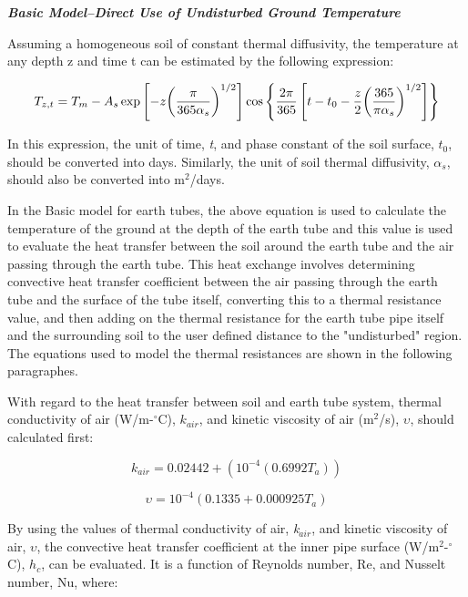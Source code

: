 \emph{\textbf{Basic Model--Direct Use of Undisturbed Ground Temperature}}

Assuming a homogeneous soil of constant thermal diffusivity, the temperature at any depth z and time t can be estimated by the following expression:

\begin{equation}
{T_{z,t}} = {T_m} - {A_s}\exp \left[ { - z{{\left( {\frac{\pi }{{{\rm{365}}{\alpha_s}}}} \right)}^{1/2}}} \right]\cos \left\{ {\frac{{2\pi }}{{{\rm{365}}}}\left[ {t - {t_0} - \frac{z}{2}{{\left( {\frac{{{\rm{365}}}}{{\pi {\alpha_s}}}} \right)}^{1/2}}} \right]} \right\}
\end{equation}

In this expression, the unit of time, \emph{t}, and phase constant of the soil surface, \(t_{0}\), should be converted into days. Similarly, the unit of soil thermal diffusivity, \({\alpha_{s}}\), should also be converted into m\(^{2}\)/days.

In the Basic model for earth tubes, the above equation is used to calculate the temperature of the ground at the depth of the earth tube and this value is used to evaluate the heat transfer between the soil around the earth tube and the air passing through the earth tube.  This heat exchange involves determining convective heat transfer coefficient between the air passing through the earth tube and the surface of the tube itself, converting this to a thermal resistance value, and then adding on the thermal resistance for the earth tube pipe itself and the surrounding soil to the user defined distance to the "undisturbed" region.  The equations used to model the thermal resistances are shown in the following paragraphes.

With regard to the heat transfer between soil and earth tube system, thermal conductivity of air (W/m-\(^{\circ}\)C), \(k_{air}\), and kinetic viscosity of air (m\(^{2}\)/s), \({\upsilon}\), should calculated first:

\begin{equation}
{k_{air}} = 0.02442 + ({10^{ - 4}}(0.6992{T_a}))
\end{equation}

\begin{equation}
\upsilon  = {10^{ - 4}}(0.1335 + 0.000925{T_a})
\end{equation}

By using the values of thermal conductivity of air, \emph{k\(_{air}\)}, and kinetic viscosity of air, \({\upsilon}\), the convective heat transfer coefficient at the inner pipe surface (W/m\(^{2}\)-\(^{\circ}\)C), \({h_c}\), can be evaluated. It is a function of Reynolds number, Re, and Nusselt number, Nu, where:


